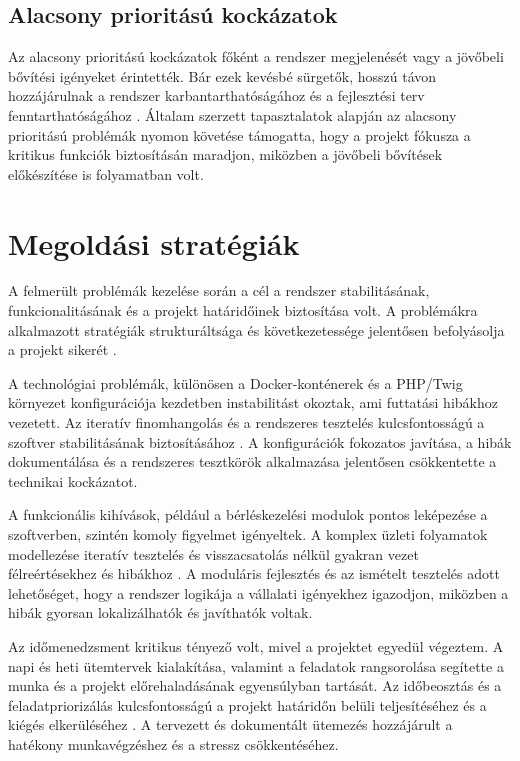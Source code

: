 \subsection{Alacsony prioritású kockázatok}

Az alacsony prioritású kockázatok főként a rendszer megjelenését vagy a jövőbeli bővítési igényeket érintették.  
Bár ezek kevésbé sürgetők, hosszú távon hozzájárulnak a rendszer karbantarthatóságához és a fejlesztési terv fenntarthatóságához \cite{Szalay2018,Kaposi2019}.  
Általam szerzett tapasztalatok alapján az alacsony prioritású problémák nyomon követése támogatta, 
hogy a projekt fókusza a kritikus funkciók biztosításán maradjon, miközben a jövőbeli bővítések előkészítése is folyamatban volt.

\section{Megoldási stratégiák}

A felmerült problémák kezelése során a cél a rendszer stabilitásának, funkcionalitásának és a projekt határidőinek biztosítása volt. 
A problémákra alkalmazott stratégiák strukturáltsága és 
következetessége jelentősen befolyásolja a projekt sikerét \cite{Hajdu2014,Szalay2018,Kaposi2019}.

A technológiai problémák, különösen a Docker-konténerek és a PHP/Twig környezet konfigurációja 
kezdetben instabilitást okoztak, ami futtatási hibákhoz vezetett. Az iteratív 
finomhangolás és a rendszeres tesztelés kulcsfontosságú a szoftver stabilitásának biztosításához \cite{Kovacs2016}. 
A konfigurációk fokozatos javítása, a hibák dokumentálása és a rendszeres tesztkörök alkalmazása jelentősen csökkentette a technikai kockázatot.

A funkcionális kihívások, például a bérléskezelési modulok pontos leképezése a szoftverben, szintén komoly figyelmet igényeltek. 
A komplex üzleti folyamatok modellezése iteratív tesztelés és 
visszacsatolás nélkül gyakran vezet félreértésekhez és hibákhoz \cite{Szalay2018,Kaposi2019}. 
A moduláris fejlesztés és az ismételt tesztelés adott lehetőséget, hogy 
a rendszer logikája a vállalati igényekhez igazodjon, miközben a hibák gyorsan lokalizálhatók és javíthatók voltak.

Az időmenedzsment kritikus tényező volt, mivel a projektet egyedül végeztem. 
A napi és heti ütemtervek kialakítása, valamint a feladatok rangsorolása segítette a munka és a projekt előrehaladásának egyensúlyban tartását.
Az időbeosztás és a feladatpriorizálás kulcsfontosságú a 
projekt határidőn belüli teljesítéséhez és a kiégés elkerüléséhez \cite{Kovacs2016,Hajdu2014}. 
A tervezett és dokumentált ütemezés hozzájárult a hatékony munkavégzéshez és a stressz csökkentéséhez.

